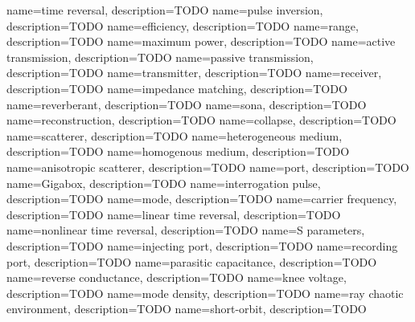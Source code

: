 
{
    name=time reversal,
    description={TODO}
}
{
   name=pulse inversion,
  description={TODO}
}
{
   name=efficiency,
  description={TODO}
}
{
   name=range,
  description={TODO}
}
{
   name=maximum power,
  description={TODO}
}
{
   name=active transmission,
  description={TODO}
}
{
   name=passive transmission,
  description={TODO}
}
{
   name=transmitter,
  description={TODO}
}
{
   name=receiver,
  description={TODO}
}
{
   name=impedance matching,
  description={TODO}
}
{
   name=reverberant,
  description={TODO}
}
{
   name=sona,
  description={TODO}
}
{
   name=reconstruction,
  description={TODO}
}
{
   name=collapse,
  description={TODO}
}
{
   name=scatterer,
  description={TODO}
}
{
   name=heterogeneous medium,
  description={TODO}
}
{
   name=homogenous medium,
  description={TODO}
}
{
   name=anisotropic scatterer,
  description={TODO}
}
{
   name=port,
  description={TODO}
}
{
   name=Gigabox,
  description={TODO}
}
{
   name=interrogation pulse,
  description={TODO}
}
{
   name=mode,
  description={TODO}
}
{
   name=carrier frequency,
  description={TODO}
}
{
   name=linear time reversal,
  description={TODO}
}
{
   name=nonlinear time reversal,
  description={TODO}
}
{
   name=S parameters,
  description={TODO}
}
{
   name=injecting port,
  description={TODO}
}
{
   name=recording port,
  description={TODO}
}
{
   name=parasitic capacitance,
  description={TODO}
}
{
   name=reverse conductance,
  description={TODO}
}
{
   name=knee voltage,
  description={TODO}
}
{
   name=mode density,
  description={TODO}
}
{
   name=ray chaotic environment,
  description={TODO}
}
{
   name=short-orbit,
  description={TODO}
}

